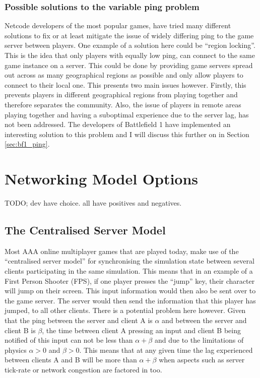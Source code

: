 \subsubsection{Possible solutions to the variable ping problem}
Netcode developers of the most popular games, have tried many different solutions to fix or at least mitigate the issue of widely differing ping to the game server between players. One example of a solution here could be ``region locking''. This is the idea that only players with equally low ping, can connect to the same game instance on a server. This could be done by providing game servers spread out across as many geographical regions as possible and only allow players to connect to their local one. This presents two main issues however. Firstly, this prevents players in different geographical regions from playing together and therefore separates the community. Also, the issue of players in remote areas playing together and having a suboptimal experience due to the server lag, has not been addressed. The developers of Battlefield 1 have implemented an interesting solution to this problem and I will discuss this further on in Section \ref{sec:bf1_ping}.


\newpage
\section{Networking Model Options}
TODO; dev have choice. all have positives and negatives.


\subsection{The Centralised Server Model}
Most AAA online multiplayer games that are played today, make use of the ``centralised server model'' for synchronising the simulation state between several clients participating in the same simulation. This means that in an example of a First Person Shooter (FPS), if one player presses the ``jump'' key, their character will jump on their screen. This input information would then also be sent over to the game server. The server would then send the information that this player has jumped, to all other clients. There is a potential problem here however. Given that the ping between the server and client A is \(\alpha\) and between the server and client B is \(\beta\), the time between client A pressing an input and client B being notified of this input can not be less than $\alpha+\beta$ and due to the limitations of physics $\alpha>0$ and $\beta>0$. This means that at any given time the lag experienced between clients A and B will be more than $\alpha+\beta$ when aspects such as server tick-rate or network congestion are factored in too.

